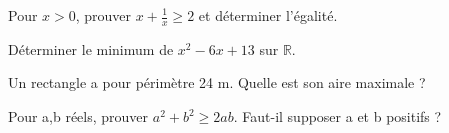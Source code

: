 \documentclass[11pt]{article}
\begin{document}
Pour \(x>0\), prouver \(x+\frac{1}{x}\geq 2\) et déterminer l’égalité.\par
\vspace{5pt}
Déterminer le minimum de \(x^{2}-6x+13\) sur \(\mathbb{R}\).\par
\vspace{5pt}
Un rectangle a pour périmètre 24 m. Quelle est son aire maximale ?\par
\vspace{5pt}
Pour a,b réels, prouver \(a^{2}+b^{2}\geq 2ab\). Faut-il supposer a et b positifs ?\par
\vspace{5pt}
\end{document}
